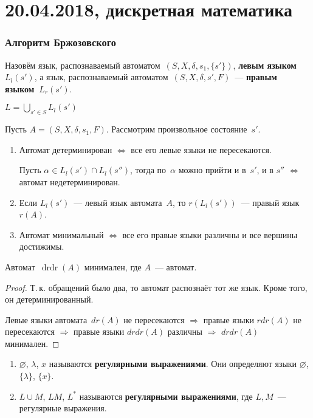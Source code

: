 \chapter{20.04.2018, дискретная математика}
\subsection{Алгоритм Бржозовского}
Назовём язык, распознаваемый автоматом~$(S, X, \delta, s_1, \{ s' \})$, \textbf{левым языком~$L_l(s')$}, а язык, распознаваемый автоматом~$(S, X, \delta, s', F)$~--- \textbf{правым языком~$L_r(s')$}.

$L = \bigcup\limits_{s' \in S} L_l(s')$

Пусть $A = (S, X, \delta, s_1, F)$.
Рассмотрим произвольное состояние~$s'$.
\begin{enumerate}
	\item Автомат детерминирован $\Leftrightarrow$ все его левые языки не пересекаются.
	\begin{proofcontra}
	Пусть $\alpha \in L_l(s') \cap L_l(s'')$, тогда по~$\alpha$ можно прийти и в~$s'$, и в $s''$ $\Leftrightarrow$ автомат недетерминирован.
	\end{proofcontra}
	
	\item Если $L_l(s')$~--- левый язык автомата~$A$, то $r(L_l(s'))$~--- правый язык~$r(A)$.
	
	\item Автомат минимальный $\Leftrightarrow$ все его правые языки различны и все вершины достижимы.
\end{enumerate}

\begin{theorem}
Автомат~$\mathop{drdr}(A)$ минимален, где $A$~--- автомат.
\end{theorem}
\begin{proof}
Т.\,к. обращений было два, то автомат распознаёт тот же язык.
Кроме того, он детерминированный.

Левые языки автомата~$dr(A)$ не пересекаются $\Rightarrow$ правые языки $rdr(A)$ не пересекаются $\Rightarrow$ правые языки $drdr(A)$ различны $\Rightarrow$ $drdr(A)$ минимален.
\end{proof}

\begin{enumerate}
	\item $\varnothing$, $\lambda$, $x$ называются \textbf{регулярными выражениями}.
	Они определяют языки $\varnothing$, $\{ \lambda \}$, $\{ x \}$.
	
	\item $L \cup M$, $LM$, $L^*$ называются \textbf{регулярными выражениями}, где $L, M$~--- регулярные выражения.
\end{enumerate}


